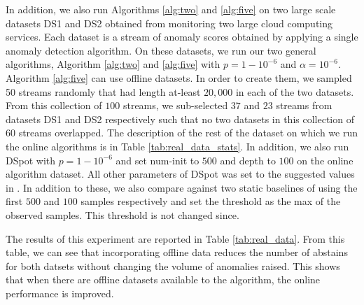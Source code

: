 In addition, we also run Algorithms \ref{alg:two} and \ref{alg:five} on two large scale datasets {\ttfamily DS1} and {\ttfamily DS2} obtained from monitoring two large cloud computing services. Each dataset is a stream of anomaly scores obtained by applying a single anomaly detection algorithm. On these datasets, we run our two general algorithms, Algorithm \ref{alg:two} and \ref{alg:five} with $p = 1 - 10^{-6}$ and $\alpha = 10^{-6}$. Algorithm \ref{alg:five} can use offline datasets. In order to create them, we sampled 50 streams randomly that had length at-least $20,000$ in each of the two datasets. From this collection of $100$ streams, we sub-selected $37$ and $23$ streams from datasets {\ttfamily DS1} and {\ttfamily DS2} respectively such that no two datasets in this collection of $60$ streams overlapped. The description of the rest of the dataset on which we run the online algorithms is in Table \ref{tab:real_data_stats}. In addition, we also run {\ttfamily DSpot} \cite{siffer2017anomaly} with $p = 1 - 10^{-6}$ and set {\ttfamily num-init} to $500$ and {\ttfamily depth} to $100$ on the online algorithm dataset. All other parameters of {\ttfamily DSpot} was set to the suggested values in \cite{siffer2017anomaly}. In addition to these, we also compare against two static baselines of using the first $500$ and $100$ samples respectively and set the threshold as the max of the observed samples. This threshold is not changed since. 

The results of this experiment are reported in Table \ref{tab:real_data}. From this table, we can see that incorporating offline data reduces the number of abstains for both datsets without changing the volume of anomalies raised. This shows that when there are offline datasets available to the algorithm, the online performance is improved. 


\begin{table}[h!]
    \centering
    \caption{Real data characteristics}
    \label{tab:real_data_stats}
\end{table}

